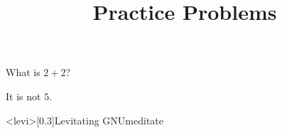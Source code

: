 \documentclass{./tex/homework}
\title{Practice Problems}
\begin{document}
 \maketitle

\question What is $2+2$?

It is not $5$.

\img<levi>[0.3]{Levitating GNU}{meditate}
\end{document}
